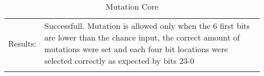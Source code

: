 \begin{table}[H]
\begin{tabular}{r | p{8cm}}
    Results: &      Successfull. 
                    Mutation is allowed only when the 6 first bits are lower than the
                    chance input, the correct amount of mutations were set and each four 
                    bit locations were selected correctly as expected by bits 23-0
                    \\
   \noalign{\smallskip}\hline\noalign{\smallskip}
  
  
  \end{tabular}
  \caption{Mutation Core}
  \label{testing:components:genetic_pipeline:mutation_core}
\end{table}
